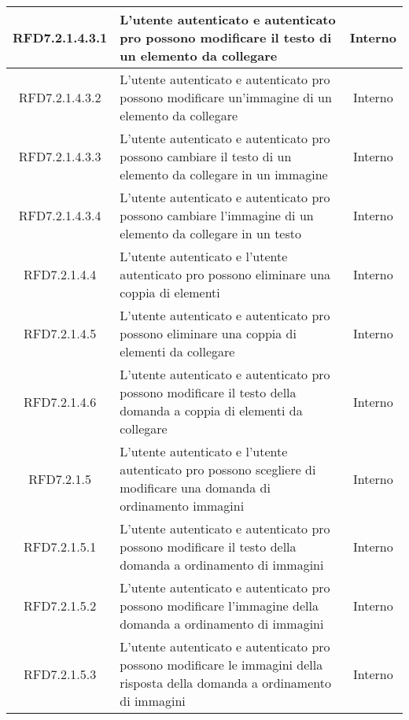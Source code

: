 \begin{longtable}{|c|>{\centering}m{7cm}|c|}
\hypertarget{RFD7.2.1.4.3.1}{RFD7.2.1.4.3.1} & L’utente autenticato e autenticato pro possono modificare il testo di un elemento da collegare & Interno
\\ \hline

\hypertarget{RFD7.2.1.4.3.2}{RFD7.2.1.4.3.2} & L’utente autenticato e autenticato pro possono modificare un’immagine di un elemento da collegare & Interno
\\ \hline

\hypertarget{RFD7.2.1.4.3.3}{RFD7.2.1.4.3.3} & L’utente autenticato e autenticato pro possono cambiare il testo di un elemento da collegare in un immagine & Interno
\\ \hline

\hypertarget{RFD7.2.1.4.3.4}{RFD7.2.1.4.3.4} & L’utente autenticato e autenticato pro possono cambiare l’immagine di un elemento da collegare in un testo & Interno
\\ \hline

\hypertarget{RFD7.2.1.4.4}{RFD7.2.1.4.4} & L’utente autenticato e l'utente autenticato pro possono eliminare una coppia di elementi & Interno
\\ \hline

\hypertarget{RFD7.2.1.4.5}{RFD7.2.1.4.5} & L’utente autenticato e autenticato pro possono eliminare una coppia di elementi da collegare & Interno
\\ \hline

\hypertarget{RFD7.2.1.4.6}{RFD7.2.1.4.6} & L’utente autenticato e autenticato pro possono modificare il testo della domanda a coppia di elementi da collegare  & Interno
\\ \hline

\hypertarget{RFD7.2.1.5}{RFD7.2.1.5} & L’utente autenticato e l’utente autenticato pro possono scegliere di modificare una domanda di ordinamento immagini & Interno
\\ \hline

\hypertarget{RFD7.2.1.5.1}{RFD7.2.1.5.1} & L’utente autenticato e autenticato pro possono modificare il testo della domanda a ordinamento di immagini & Interno
\\ \hline

\hypertarget{RFD7.2.1.5.2}{RFD7.2.1.5.2} & L’utente autenticato e autenticato pro possono modificare l’immagine della domanda a ordinamento di immagini  & Interno
\\ \hline

\hypertarget{RFD7.2.1.5.3}{RFD7.2.1.5.3} & L’utente autenticato e autenticato pro possono modificare le immagini della risposta della domanda a ordinamento di immagini & Interno
\\ \hline


\end{longtable}
